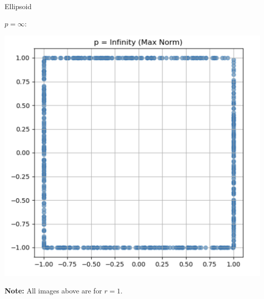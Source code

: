 \begin{ex}[Ellipsoid]{Ellipsoid}
\begin{itemize}
\begin{minipage}{0.33\textwidth}
\begin{center}
                \end{center}
        \end{minipage}
        \begin{minipage}{0.33\textwidth}
            \item 
                $p = \infty$: 
                \begin{center}
                    \hspace{-1.5cm}\includegraphics[scale = 0.25]{Images/Fundamental/MaxBall.png}
                \end{center}
        \end{minipage}
    \end{itemize}

    \textbf{Note:} All images above are for $r = 1$.
\end{ex}


